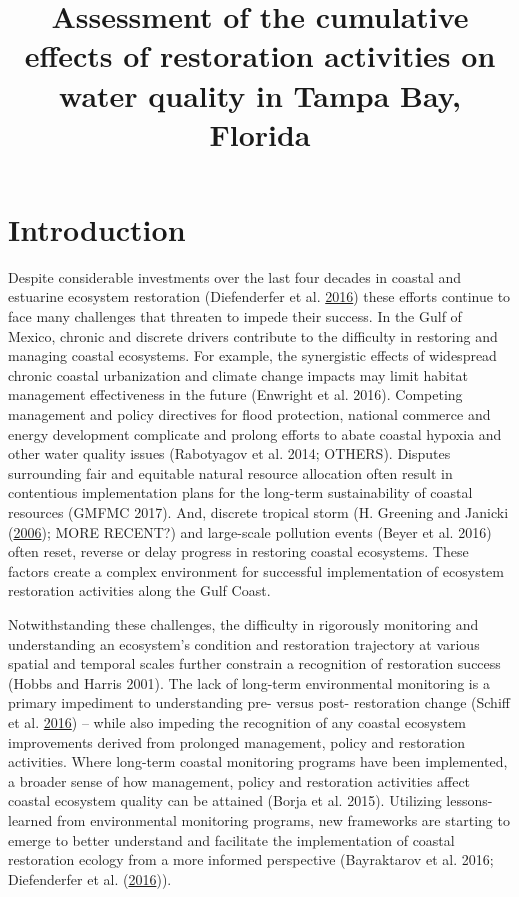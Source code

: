 \documentclass[]{article}
\title{Assessment of the cumulative effects of restoration activities on water
quality in Tampa Bay, Florida}
\author{}
\date{}
\begin{document}
\maketitle

\section{Introduction}\label{introduction}

Despite considerable investments over the last four decades in coastal
and estuarine ecosystem restoration (Diefenderfer et al.
\protect\hyperlink{ref-Diefenderfer16}{2016}) these efforts continue to
face many challenges that threaten to impede their success. In the Gulf
of Mexico, chronic and discrete drivers contribute to the difficulty in
restoring and managing coastal ecosystems. For example, the synergistic
effects of widespread chronic coastal urbanization and climate change
impacts may limit habitat management effectiveness in the future
(Enwright et al. 2016). Competing management and policy directives for
flood protection, national commerce and energy development complicate
and prolong efforts to abate coastal hypoxia and other water quality
issues (Rabotyagov et al. 2014; OTHERS). Disputes surrounding fair and
equitable natural resource allocation often result in contentious
implementation plans for the long-term sustainability of coastal
resources (GMFMC 2017). And, discrete tropical storm (H. Greening and
Janicki (\protect\hyperlink{ref-Greening06}{2006}); MORE RECENT?) and
large-scale pollution events (Beyer et al. 2016) often reset, reverse or
delay progress in restoring coastal ecosystems. These factors create a
complex environment for successful implementation of ecosystem
restoration activities along the Gulf Coast.

Notwithstanding these challenges, the difficulty in rigorously
monitoring and understanding an ecosystem's condition and restoration
trajectory at various spatial and temporal scales further constrain a
recognition of restoration success (Hobbs and Harris 2001). The lack of
long-term environmental monitoring is a primary impediment to
understanding pre- versus post- restoration change (Schiff et al.
\protect\hyperlink{ref-Schiff16}{2016}) -- while also impeding the
recognition of any coastal ecosystem improvements derived from prolonged
management, policy and restoration activities. Where long-term coastal
monitoring programs have been implemented, a broader sense of how
management, policy and restoration activities affect coastal ecosystem
quality can be attained (Borja et al. 2015). Utilizing lessons-learned
from environmental monitoring programs, new frameworks are starting to
emerge to better understand and facilitate the implementation of coastal
restoration ecology from a more informed perspective (Bayraktarov et al.
2016; Diefenderfer et al.
(\protect\hyperlink{ref-Diefenderfer16}{2016})).
\end{document}
